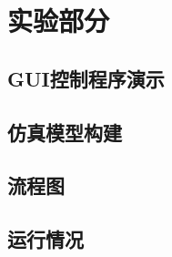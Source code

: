 \documentclass[cs4size,a4paper]{ctexart}
\numberwithin{equation}{section}
\numberwithin{table}{section}
\numberwithin{figure}{section}
\begin{document}
\section{实验部分}

\subsection{GUI控制程序演示}

\subsection{仿真模型构建}

\subsection{流程图}

\subsection{运行情况}

\end{document}
